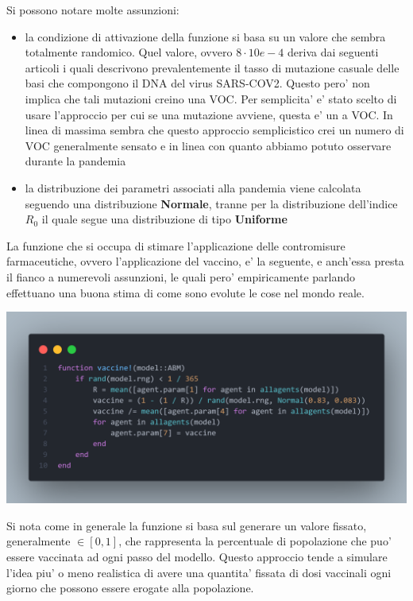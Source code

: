 Si possono notare molte assunzioni:
\begin{itemize}
	\item la condizione di attivazione della funzione si basa su un valore
	che sembra totalmente randomico. Quel valore, ovvero $8 \cdot 10e-4$ deriva dai
	seguenti articoli \cite{Markov2023} \cite{https://doi.org/10.1002/jmv.27331} \cite{Abavisani2022}
	i quali descrivono prevalentemente il tasso di mutazione casuale delle basi che compongono
	il DNA del virus SARS-COV2. Questo pero' non implica che tali mutazioni 
	creino una VOC. Per semplicita' e' stato scelto di usare l'approccio per cui
	se una mutazione avviene, questa e' un a VOC. In linea di massima sembra che 
	questo approccio semplicistico crei un numero di VOC generalmente sensato e 
	in linea con quanto abbiamo potuto osservare durante la pandemia
	\item la distribuzione dei parametri associati alla pandemia viene calcolata
	seguendo una distribuzione \textbf{Normale}, tranne per la distribuzione dell'indice $R_0$
	il quale segue una distribuzione di tipo \textbf{Uniforme} \cite{wiki:Numero_di_riproduzione_di_base}
\end{itemize}

La funzione che si occupa di stimare l'applicazione delle contromisure farmaceutiche, ovvero l'applicazione del vaccino,
e' la seguente, e anch'essa presta il fianco a numerevoli assunzioni, le quali pero' empiricamente parlando
effettuano una buona stima di come sono evolute le cose nel mondo reale.

\begin{minipage}{\linewidth}
	\centering
	\includegraphics[width=\textwidth]{img/vaccine.png}
	\label{fig:vaccine}
\end{minipage}

Si nota come in generale la funzione si basa sul generare un valore fissato, generalmente $\in [0,1]$, che 
rappresenta la percentuale di popolazione che puo' essere vaccinata ad ogni passo del modello.
Questo approccio tende a simulare l'idea piu' o meno realistica di avere una quantita' fissata di 
dosi vaccinali ogni giorno che possono essere erogate alla popolazione. 

